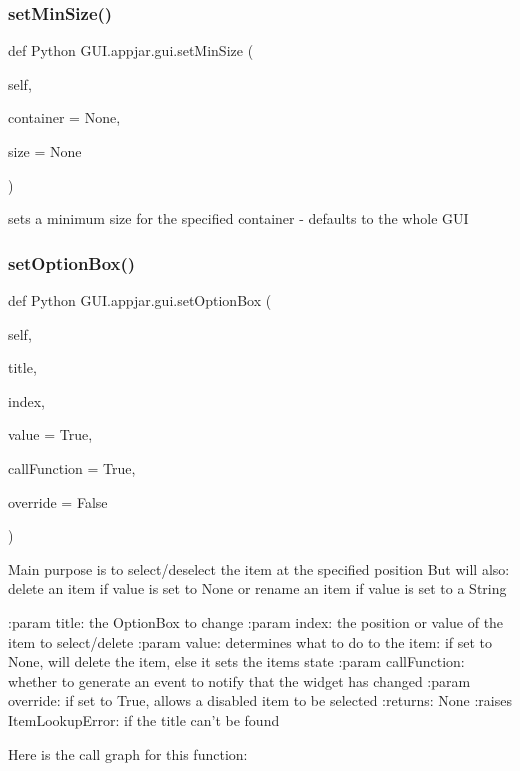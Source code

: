 \begin{DoxyVerb}
\subsubsection{\texorpdfstring{set\+Min\+Size()}{setMinSize()}}
{\footnotesize\ttfamily def Python G\+U\+I.\+appjar.\+gui.\+set\+Min\+Size (\begin{DoxyParamCaption}\item[{}]{self,  }\item[{}]{container = {\ttfamily None},  }\item[{}]{size = {\ttfamily None} }\end{DoxyParamCaption})}

\begin{DoxyVerb}sets a minimum size for the specified container - defaults to the whole GUI \end{DoxyVerb}
 \mbox{\label{class_python_01_g_u_i_1_1appjar_1_1gui_a3de52310d141739c74dfe53e032cc55c}} 
\subsubsection{\texorpdfstring{set\+Option\+Box()}{setOptionBox()}}
{\footnotesize\ttfamily def Python G\+U\+I.\+appjar.\+gui.\+set\+Option\+Box (\begin{DoxyParamCaption}\item[{}]{self,  }\item[{}]{title,  }\item[{}]{index,  }\item[{}]{value = {\ttfamily True},  }\item[{}]{call\+Function = {\ttfamily True},  }\item[{}]{override = {\ttfamily False} }\end{DoxyParamCaption})}

\begin{DoxyVerb}Main purpose is to select/deselect the item at the specified position
But will also: delete an item if value is set to None or rename an item if value is set to a String

:param title: the OptionBox to change
:param index: the position or value of the item to select/delete
:param value: determines what to do to the item: if set to None, will delete the item, else it sets the items state
:param callFunction: whether to generate an event to notify that the widget has changed
:param override: if set to True, allows a disabled item to be selected
:returns: None
:raises ItemLookupError: if the title can't be found
\end{DoxyVerb}
 Here is the call graph for this function\+:
\mbox{\label{class_python_01_g_u_i_1_1appjar_1_1gui_ab576e1f4e9ffbbe7b5caa572ecfa7fd0}} 

\end{DoxyVerb}
